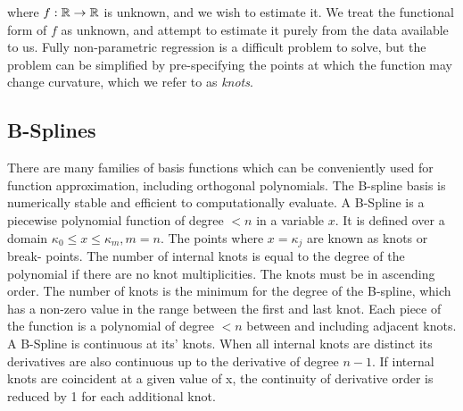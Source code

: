 \noindent where $f: {\mathbb{R}} \to {\mathbb{R}}$ is unknown, and we wish to estimate it. We treat
the functional form of $f$ as unknown, and attempt to estimate it purely from
the data available to us. Fully non-parametric regression is a difficult problem
to solve, but the problem can be simplified by pre-specifying the points at
which the function may change curvature, which we refer to as \emph{knots}.

\subsection{B-Splines}


There are many families of basis functions which can be conveniently used for
function approximation, including orthogonal polynomials. The B-spline basis
\citep{DeBoor1972} is numerically stable and efficient to computationally
evaluate. A B-Spline is a piecewise polynomial function of degree $< n$ in a
variable $x$. It is defined over a domain $\kappa_0 \leq x \leq \kappa_m, m=n$.
The points where $x = \kappa_j$ are known as knots or break- points. The number
of internal knots is equal to the degree of the polynomial if there are no knot
multiplicities. The knots must be in ascending order. The number of knots is the
minimum for the degree of the B-spline, which has a non-zero value in the range
between the first and last knot. Each piece of the function is a polynomial of
degree $< n$ between and including adjacent knots. A B-Spline is continuous at
its' knots. When all internal knots are distinct its derivatives are also
continuous up to the derivative of degree $n - 1$. If internal knots are
coincident at a given value of x, the continuity of derivative order is reduced
by 1 for each additional knot.

